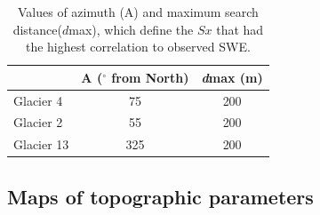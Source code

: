 \documentclass[12pt]{article}
\begin{document}
\begin{enumerate}
\begin{table}[]
\centering
\caption{Values of azimuth (A) and maximum search distance($d$max), which define the $Sx$ that had the highest correlation to observed SWE.}
\label{tab:Sxparams}
\begin{tabular}{lcc}
           & \textbf{A ($^{\circ}$ from North)} & \textbf{\textit{d}max (m)} \\ \hline
Glacier 4  & 75                                & 200                 \\
Glacier 2  & 55                                & 200                 \\
Glacier 13 & 325                            & 200                
\end{tabular}
\end{table}



\end{enumerate}


\subsection{Maps of topographic parameters}
\end{document}
